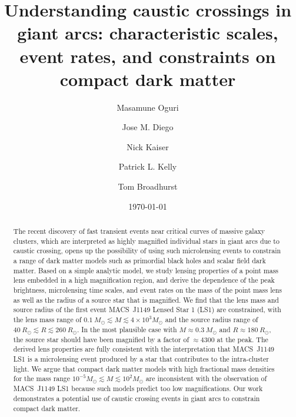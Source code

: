 \documentclass[showpacs,twocolumn,preprintnumbers,amsmath,amssymb,superscriptaddress,nofootinbib]{revtex4}
\begin{document}
\title{Understanding caustic crossings in giant arcs: characteristic
  scales, event rates, and constraints on compact dark matter}

\author{Masamune Oguri}
\author{Jose M. Diego}
\author{Nick Kaiser}
\author{Patrick L. Kelly}
\author{Tom Broadhurst}

\date{\today}

\begin{abstract}
The recent discovery of fast transient events near critical curves of
massive galaxy clusters, which are interpreted as highly magnified
individual stars in giant arcs due to caustic crossing, opens up the
possibility of using such microlensing events to constrain a range of
dark matter models such as primordial black holes and scalar field
dark matter. Based on a simple analytic model, we study lensing
properties of a point mass lens embedded in a high magnification
region, and derive the dependence of the peak brightness, microlensing
time scales, and event rates on the mass of the point mass lens as
well as the radius of a source star that is magnified. We find that 
the lens mass and source radius of the first event MACS~J1149 Lensed
Star 1 (LS1) are constrained, with the lens mass range of
$0.1~M_\odot \lesssim M \lesssim 4\times 10^3M_\odot$  and the source radius
range of $40~R_\odot \lesssim R \lesssim 260~R_\odot$. In the most
plausible case with $M\approx 0.3~M_\odot$ and $R\approx 180~R_\odot$,
the source star should have been magnified by a factor of 
$\approx 4300$ at the peak. The derived lens properties are fully
consistent with the interpretation that MACS~J1149 LS1 is a
microlensing event produced by a star that contributes to the
intra-cluster light. We argue that compact dark matter models with
high fractional mass densities for the mass range $10^{-5}M_\odot
\lesssim M\lesssim 10^2M_\odot$ are inconsistent with the observation of
MACS~J1149 LS1 because such models predict too low magnifications.
Our work demonstrates a potential use of caustic 
crossing events in giant arcs to constrain compact dark matter.
\end{abstract}
\end{document}
